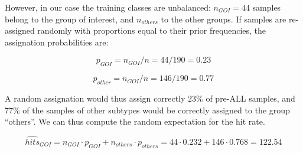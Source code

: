 However, in our case the training classes are unbalanced: $n_{GOI}=44$
samples belong to the group of interest, and $n_{others}$ to the other
groups. If samples are re-assigned randomly with proportions equal to
their prior frequencies, the assignation probabilities are:

\[p_{GOI}= n_{GOI}/n = 44/190=0.23\]

\[p_{other}= n_{GOI}/n = 146/190=0.77\]

A random assignation would thus assign correctly $23\%$ of pre-ALL
samples, and $77\%$ of the samples of other subtypes would be correctly
assigned to the group ``others''. We can thus compute the random
expectation for the hit rate.

\[\hat{hits}_{GOI} = n_{GOI} \cdot p_{GOI} + n_{others} \cdot p_{others} = 44 \cdot 0.232 + 146 \cdot 0.768 = 122.54\]

